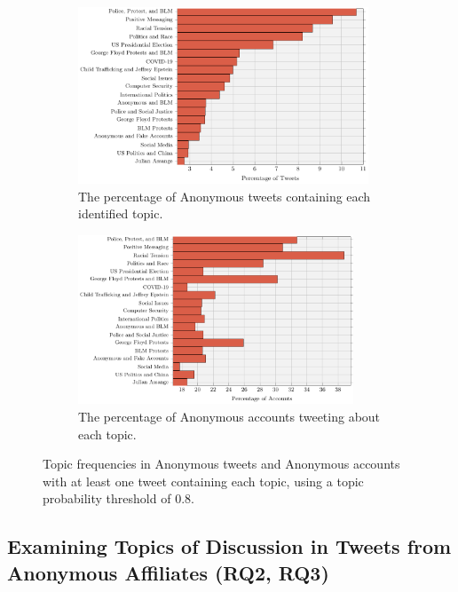 \documentclass[letterpaper]{article}
\begin{document}
\begin{figure}[!htp]
\centering
\begin{subfigure}[b]{0.4\textwidth}
    \centering
    \includegraphics[width=0.95\textwidth]{topic_tweet_perc.pdf}
    \caption{The percentage of Anonymous tweets containing each identified topic.}
    \label{fig:topicTweetPercs}
\end{subfigure}
\quad
\begin{subfigure}[b]{0.4\textwidth}
     \centering
     \includegraphics[width=0.9\textwidth]{topic_account_perc.pdf}
     \caption{The percentage of Anonymous accounts tweeting about each topic.}
     \label{fig:topicAccountPercs}
\end{subfigure}
\caption{Topic frequencies in Anonymous tweets and Anonymous accounts with at least one tweet containing each topic, using a topic probability threshold of 0.8.}
\label{fig:topicPercs}
\end{figure}

\subsection{Examining Topics of Discussion in Tweets from Anonymous Affiliates (RQ2, RQ3)}
\label{topic_analysis}
\end{document}
